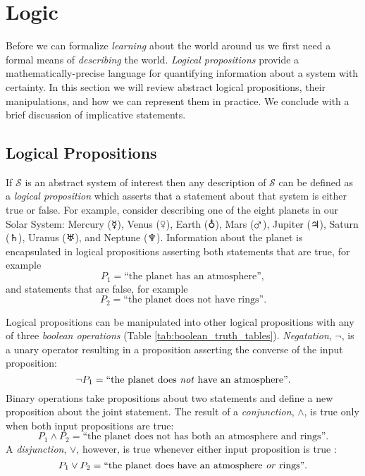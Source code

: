 \chapter{Logic}

Before we can formalize \emph{learning} about the world around us we 
first need a formal means of \emph{describing} the world.  \emph{Logical 
propositions} provide a mathematically-precise language for quantifying
information about a system with certainty.  In this section we will review 
abstract logical propositions, their manipulations, and how we can 
represent them in practice.  We conclude with a brief discussion of 
implicative statements.

\section{Logical Propositions}

If $\mathcal{S}$ is an abstract system of interest then any description of 
$\mathcal{S}$ can be defined as a \emph{logical proposition} which asserts
that a statement about that system is either true or false.  For example, 
consider describing one of the eight planets in our Solar System: Mercury 
($\mercury$), Venus ($\venus$), Earth ($\earth$), Mars ($\mars$), Jupiter 
($\jupiter$), Saturn ($\saturn$), Uranus ($\uranus$), and Neptune ($\neptune$).  
Information about the planet is encapsulated in logical propositions asserting
both statements that are true, for example
%
\begin{equation*}
P_{1} = \text{``the planet has an atmosphere''},
\end{equation*}
%
and statements that are false, for example
\begin{equation*} 
P_{2}=\text{``the planet does not have rings''}.
\end{equation*} 

Logical propositions can be manipulated into other logical propositions
with any of three \emph{boolean operations} (Table 
\ref{tab:boolean_truth_tables}).  \emph{Negatation}, $\neg$, is a unary 
operator resulting in a proposition asserting the converse of the input 
proposition: 
%
\begin{equation*}
\neg P_{1}=\text{``the planet does \emph{not} have an atmosphere''}.
\end{equation*}
%
Binary operations take propositions about two statements and define 
a new proposition about the joint statement.  The result of a 
\emph{conjunction}, $\wedge$, is true only when both input propositions 
are true:
%
\begin{equation*}
P_{1} \wedge P_{2} =
 \text{``the planet does not has both an atmosphere and rings''}.  
\end{equation*}
%
A \emph{disjunction}, $\vee$, however, is true whenever either input 
proposition is true : 
%
\begin{equation*}
P_{1} \vee P_{2} =
\text{``the planet does have an atmosphere \emph{or} rings''}.
\end{equation*}

